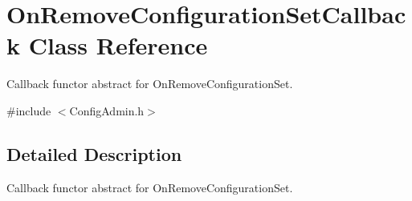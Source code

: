\section{OnRemoveConfigurationSetCallback Class Reference}
\label{classOnRemoveConfigurationSetCallback}


Callback functor abstract for OnRemoveConfigurationSet.  




{\ttfamily \#include $<$ConfigAdmin.h$>$}



\subsection{Detailed Description}
Callback functor abstract for OnRemoveConfigurationSet. 